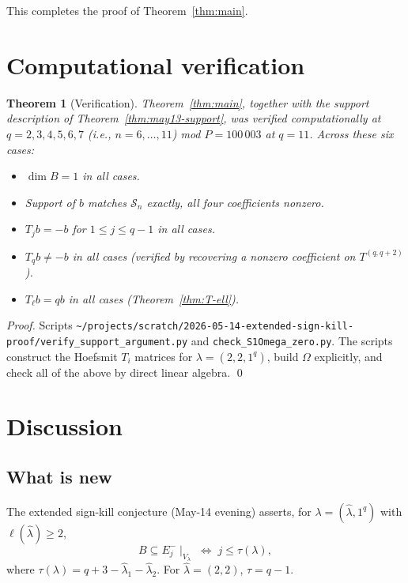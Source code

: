 \documentclass[11pt]{article}
\newtheorem{theorem}{Theorem}
\theoremstyle{definition}
\newcommand{\Vlam}{V_\lambda}
\newcommand{\Om}{\Omega}
\newcommand{\hatl}{\widehat\lambda}
\begin{document}
This completes the proof of Theorem~\ref{thm:main}.

\section{Computational verification}\label{sec:verify}

\begin{theorem}[Verification]\label{thm:verify}
Theorem~\ref{thm:main}, together with the support description of
Theorem~\ref{thm:may13-support}, was verified
computationally at $q = 2, 3, 4, 5, 6, 7$ (i.e., $n = 6, \ldots, 11$)
mod $P = 100\,003$ at $q = 11$.  Across these six cases:
\begin{itemize}[topsep=0.3em,itemsep=0.1em]
\item $\dim B = 1$ in all cases.
\item Support of $b$ matches $\mathcal{S}_n$ exactly, all four
  coefficients nonzero.
\item $T_j b = -b$ for $1 \le j \le q-1$ in all cases.
\item $T_q b \ne -b$ in all cases (verified by recovering a nonzero
  coefficient on $T^{(q, q+2)}$).
\item $T_\ell b = q b$ in all cases (Theorem~\ref{thm:T-ell}).
\end{itemize}
\end{theorem}

\begin{proof}
Scripts
\texttt{\textasciitilde/projects/scratch/2026-05-14-extended-sign-kill-proof/verify\_support\_argument.py}
and \texttt{check\_S1Omega\_zero.py}.  The scripts construct the
Hoefsmit $T_i$ matrices for $\lambda = (2,2,1^q)$, build $\Om$
explicitly, and check all of the above by direct linear algebra.
\qed
\end{proof}

\section{Discussion}\label{sec:discussion}

\subsection{What is new}

The extended sign-kill conjecture (May-14 evening) asserts, for
$\lambda = (\hatl, 1^q)$ with $\ell(\hatl) \ge 2$,
\[
   B \subseteq E_j^-\!\mid_{\Vlam} \;\Longleftrightarrow\; j \le \tau(\lambda),
\]
where $\tau(\lambda) = q + 3 - \hatl_1 - \hatl_2$.  For $\hatl = (2,2)$,
$\tau = q - 1$.
\end{document}

